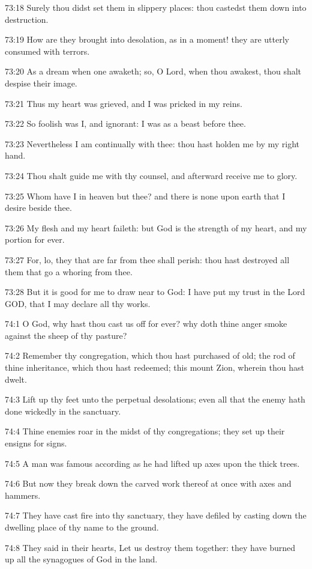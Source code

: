 73:18 Surely thou didst set them in slippery places: thou castedst
them down into destruction.

73:19 How are they brought into desolation, as in a moment! they are
utterly consumed with terrors.

73:20 As a dream when one awaketh; so, O Lord, when thou awakest, thou
shalt despise their image.

73:21 Thus my heart was grieved, and I was pricked in my reins.

73:22 So foolish was I, and ignorant: I was as a beast before thee.

73:23 Nevertheless I am continually with thee: thou hast holden me by
my right hand.

73:24 Thou shalt guide me with thy counsel, and afterward receive me
to glory.

73:25 Whom have I in heaven but thee? and there is none upon earth
that I desire beside thee.

73:26 My flesh and my heart faileth: but God is the strength of my
heart, and my portion for ever.

73:27 For, lo, they that are far from thee shall perish: thou hast
destroyed all them that go a whoring from thee.

73:28 But it is good for me to draw near to God: I have put my trust
in the Lord GOD, that I may declare all thy works.



74:1 O God, why hast thou cast us off for ever? why doth thine anger
smoke against the sheep of thy pasture?

74:2 Remember thy congregation, which thou hast purchased of old; the
rod of thine inheritance, which thou hast redeemed; this mount Zion,
wherein thou hast dwelt.

74:3 Lift up thy feet unto the perpetual desolations; even all that
the enemy hath done wickedly in the sanctuary.

74:4 Thine enemies roar in the midst of thy congregations; they set up
their ensigns for signs.

74:5 A man was famous according as he had lifted up axes upon the
thick trees.

74:6 But now they break down the carved work thereof at once with axes
and hammers.

74:7 They have cast fire into thy sanctuary, they have defiled by
casting down the dwelling place of thy name to the ground.

74:8 They said in their hearts, Let us destroy them together: they
have burned up all the synagogues of God in the land.

